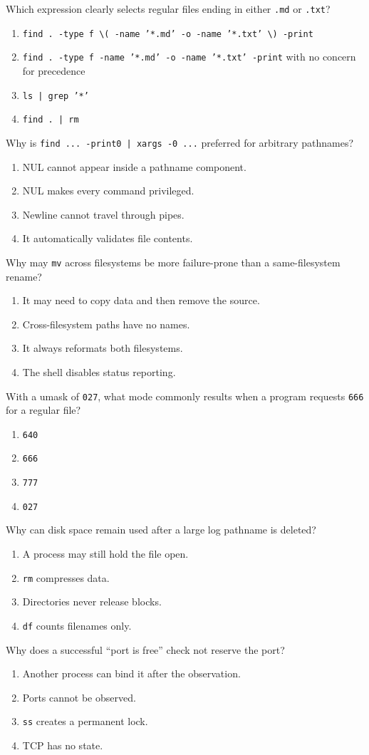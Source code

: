 \documentclass[11pt,oneside,openany]{book}
\newcommand{\fourchoices}[4]{%
  \begin{enumerate}[label=\Alph*),leftmargin=2em,itemsep=0.25em]
    \item #1
    \item #2
    \item #3
    \item #4
  \end{enumerate}}
\begin{document}
\begin{questionbox}[title={Hard 25 -- \texttt{find} precedence}]
Which expression clearly selects regular files ending in either \texttt{.md} or \texttt{.txt}?
\fourchoices{\texttt{find . -type f \textbackslash( -name '*.md' -o -name '*.txt' \textbackslash) -print}}{\texttt{find . -type f -name '*.md' -o -name '*.txt' -print} with no concern for precedence}{\texttt{ls | grep '*'}}{\texttt{find . | rm}}
\end{questionbox}

\begin{questionbox}[title={Hard 26 -- Filename protocol}]
Why is \texttt{find ... -print0 | xargs -0 ...} preferred for arbitrary pathnames?
\fourchoices{NUL cannot appear inside a pathname component.}{NUL makes every command privileged.}{Newline cannot travel through pipes.}{It automatically validates file contents.}
\end{questionbox}

\begin{questionbox}[title={Hard 27 -- Moving across filesystems}]
Why may \texttt{mv} across filesystems be more failure-prone than a same-filesystem rename?
\fourchoices{It may need to copy data and then remove the source.}{Cross-filesystem paths have no names.}{It always reformats both filesystems.}{The shell disables status reporting.}
\end{questionbox}

\begin{questionbox}[title={Hard 28 -- Creation modes}]
With a umask of \texttt{027}, what mode commonly results when a program requests \texttt{666} for a regular file?
\fourchoices{\texttt{640}}{\texttt{666}}{\texttt{777}}{\texttt{027}}
\end{questionbox}

\begin{questionbox}[title={Hard 29 -- Missing disk space}]
Why can disk space remain used after a large log pathname is deleted?
\fourchoices{A process may still hold the file open.}{\texttt{rm} compresses data.}{Directories never release blocks.}{\texttt{df} counts filenames only.}
\end{questionbox}

\begin{questionbox}[title={Hard 30 -- Port race}]
Why does a successful “port is free” check not reserve the port?
\fourchoices{Another process can bind it after the observation.}{Ports cannot be observed.}{\texttt{ss} creates a permanent lock.}{TCP has no state.}
\end{questionbox}
\end{document}

